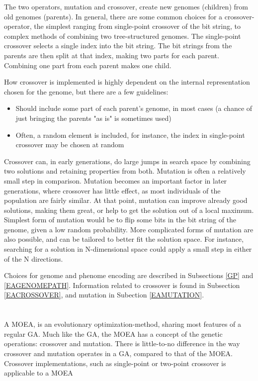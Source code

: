 \documentclass[10pt,a4paper]{book}
\begin{document}
The two operators, mutation and crossover, create new genomes (children) from old genomes (parents). In general, there are some common choices for a crossover-operator, the simplest ranging from single-point crossover of the bit string, to complex methods of combining two tree-structured genomes. The single-point crossover selects a single index into the bit string. The bit strings from the parents are then split at that index, making two parts for each parent. Combining one part from each parent makes one child. 


How crossover is implemented is highly dependent on the internal representation chosen for the genome, but there are a few guidelines:

\begin{itemize}
\item Should include some part of each parent's genome, in most cases (a chance of just bringing the parents "as is" is sometimes used)
\item Often, a random element is included, for instance, the index in single-point crossover may be chosen at random
\end{itemize}

Crossover can, in early generations, do large jumps in search space by combining two solutions and retaining properties from both. Mutation is often a relatively small step in comparison. Mutation becomes an important factor in later generations, where crossover has little effect, as most individuals of the population are fairly similar. At that point, mutation can improve already good solutions, making them great, or help to get the solution out of a local maximum. Simplest form of mutation would be to flip some bits in the bit string of the genome, given a low random probability. More complicated forms of mutation are also possible, and can be tailored to better fit the solution space. For instance, searching for a solution in N-dimensional space could apply a small step in either of the N directions.

Choices for genome and phenome encoding are described in Subsections \ref{GP} and \ref{EAGENOMEPATH}. Information related to crossover  is found in Subsection \ref{EACROSSOVER}, and mutation in Subection \ref{EAMUTATION}.


\section{}


A \gls{MOEA}, is an evolutionary optimization-method, sharing most features of a regular \gls{GA}. Much like the \gls{GA}, the \gls{MOEA} has a concept of the genetic operations: crossover and mutation. There is little-to-no difference in the way crossover and mutation operates in a \gls{GA}, compared to that of the \gls{MOEA}. Crossover implementations, such as single-point or two-point crossover is applicable to a \gls{MOEA}
\end{document}
